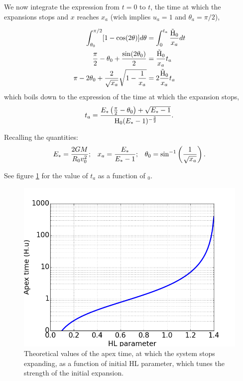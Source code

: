 We now integrate the expression from $t=0$ to $t$, the time at which the expansions stops and $x$ reaches $x_a$ (wich implies $u_a = 1$ and $\theta_a = \pi /2$), 

\begin{align}
\int^{\pi/2}_{\theta_0} [ 1 - \cos(2\theta)]d\theta  & = \int^{t_a}_0 \frac{\tilde{{\textrm{H}}}_0}{x_a} dt\\
\frac{\pi}{2} - \theta_0 + \frac{\sin(2\theta_0)}{2} & =  \frac{\tilde{{\textrm{H}}}_0}{x_a} t_a\\
\pi - 2 \theta_0 + \frac{2}{\sqrt{x_a}}\sqrt{1-\frac{1}{x_a}} & = 2 \frac{\tilde{{\textrm{H}}}_0}{x_a} t_a 
\end{align}
which boils down to the expression of the time at which the expansion stops,
\begin{equation}
t_a = \frac{E_\ast \left(\frac{\pi}{2} - \theta_0\right) + \sqrt{E_\ast-1}}{{\textrm{H}}_0 (E_\ast-1)^{-\frac{3}{2}}}.
\end{equation}

Recalling the quantities:
\begin{align}
E_\ast = \frac{2GM}{R_0 v_0^2}        &;  & x_a=\frac{E_\ast}{E_\ast-1}  &;  &\theta_0 = \sin^{-1}\left(\frac{1}{\sqrt{x_a}}\right).  
\end{align}

See figure \ref{Fig:apextime} for the value of $t_a$ as a function of \Hub$_0$.

\begin{figure}
\center
\includegraphics[width=0.7\linewidth]{Figures/1_apextime.png}
\caption{Theoretical values of the apex time, at which the system stops expanding, as a function of initial HL parameter, which tunes the strength of the initial expansion.}
\label{Fig:apextime}
\end{figure} 






